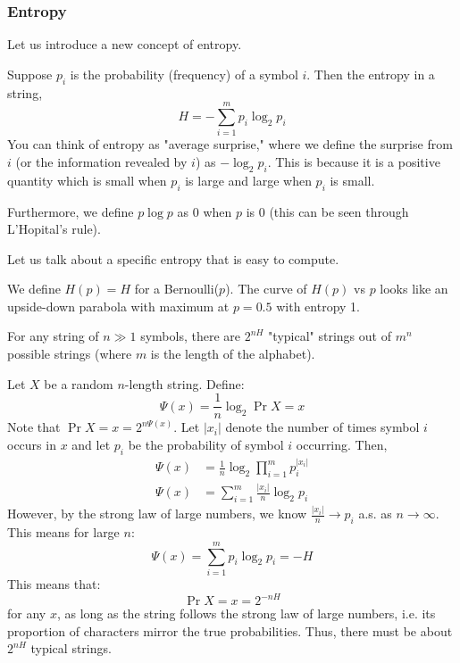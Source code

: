 \subsubsection{Entropy}
Let us introduce a new concept of entropy.

\begin{definition}
    Suppose $p_i$ is the probability (frequency) of a symbol $i$. Then the entropy in a string,
    \[ H = - \sum_{i = 1}^m p_i \log_2{p_i} \]
    You can think of entropy as "average surprise," where we define the surprise from $i$ (or the information revealed by $i$)
    as $- \log_2{p_i}$. This is because it is a positive quantity which is small when $p_i$ is large and large when $p_i$ is small.

    Furthermore, we define $p \log p$ as 0 when $p$ is 0 (this can be seen through L'Hopital's rule).
\end{definition}

Let us talk about a specific entropy that is easy to compute.
\begin{example}
    We define $H(p) = H$ for a Bernoulli($p$). The curve of $H(p)$ vs $p$
    looks like an upside-down parabola with maximum at $p = 0.5$ with entropy 1.
\end{example}

\begin{theorem}
    For any string of $n \gg 1$ symbols, there are $2^{nH}$ "typical" strings out of $m^n$ possible strings (where $m$ is the length of the alphabet).

    \begin{proof*}
        Let $X$ be a random $n$-length string. Define:
        \[ \Psi(x) = \frac{1}{n} \log_2 {\Pr{X = x}} \]
        Note that $\Pr{X = x} = 2^{n \Psi(x)}$.
        Let $|x_i|$ denote the number of times symbol $i$ occurs in $x$ and let $p_i$ be the probability of symbol $i$ occurring. Then,
        \begin{align*}
            \Psi(x) &= \frac{1}{n} \log_2 {\prod_{i =1}^m p_i^{|x_i|}} \\
            \Psi(x) &= \sum_{i = 1}^m \frac{|x_i|}{n} \log_2{p_i}
        \end{align*}
        However, by the strong law of large numbers, we know $\frac{|x_i|}{n} \to p_i$ a.s. as $n \to \infty$. This means for large $n$:
        \[ \Psi(x) = \sum_{i = 1}^m p_i \log_2{p_i} = - H \]
        This means that:
        \[ \Pr{X = x} = 2^{-nH} \]
        for any $x$, as long as the string follows the strong law of large numbers, i.e. its proportion of characters mirror
        the true probabilities.
        Thus, there must be about $2^{nH}$ typical strings.
    \end{proof*}
\end{theorem}

